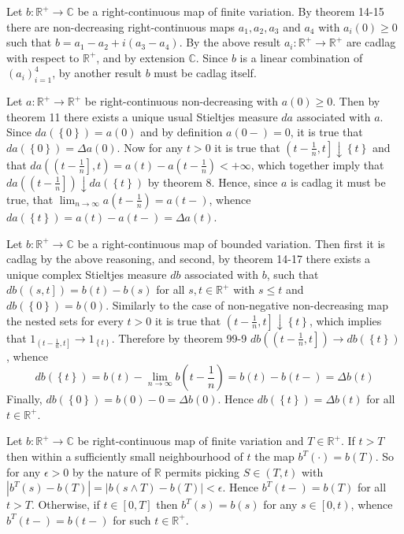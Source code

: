 \documentclass[a4paper]{article}
\newcommand{\obj}[1]{\left\{ #1 \right \}}
\newcommand{\clo}[1]{\left [ #1 \right ]}
\newcommand{\clop}[1]{\left [ #1 \right )}
\newcommand{\ploc}[1]{\left ( #1 \right ]}
\newcommand{\brac}[1]{\left ( #1 \right )}
\newcommand{\abs}[1]{\left | #1 \right |}
\newcommand{\Real}{\mathbb{R}}
\newcommand{\Cplx}{\mathbb{C}}
\begin{document}
Let $b:\Real^+\to \Cplx$ be a right-continuous map of finite variation. By theorem 14-15 there are non-decreasing right-continuous maps $a_1, a_2, a_3$ and $a_4$ with $a_i\brac{0}\geq 0$ such that $b=a_1-a_2+i\brac{a_3-a_4}$. By the above result $a_i:\Real^+\to\Real^+$ are cadlag with respect to $\Real^+$, and by extension $\Cplx$. Since $b$ is a linear combination of $\brac{a_i}_{i=1}^4$, by another result $b$ must be cadlag itself.

Let $a:\Real^+\to \Real^+$ be right-continuous non-decreasing with $a\brac{0}\geq 0$. Then by theorem 11 there exists a unique usual Stieltjes measure $da$ associated with $a$. Since $da\brac{\obj{0}}=a\brac{0}$ and by definition $a\brac{0-}=0$, it is true that $da\brac{\obj{0}}=\Delta a\brac{0}$. Now for any $t>0$ it is true that $\ploc{t-\frac{1}{n},t}\downarrow \obj{t}$ and that $da\brac{\ploc{t-\frac{1}{n}},t}=a\brac{t}-a\brac{t-\frac{1}{n}}<+\infty$, which together imply that $da\brac{\ploc{t-\frac{1}{n}}}\downarrow da\brac{\obj{t}}$ by theorem 8. Hence, since $a$ is cadlag it must be true, that $\lim_{n\to\infty} a\brac{t-\frac{1}{n}}=a\brac{t-}$, whence $da\brac{\obj{t}} = a\brac{t}-a\brac{t-} = \Delta a\brac{t}$.

Let $b:\Real^+\to \Cplx$ be a right-continuous map of bounded variation. Then first it is cadlag by the above reasoning, and second, by theorem 14-17 there exists a unique complex Stieltjes measure $db$ associated with $b$, such that $db\brac{\ploc{s,t}}=b\brac{t}-b\brac{s}$ for all $s,t\in \Real^+$ with $s\leq t$ and $db\brac{\obj{0}}=b\brac{0}$. Similarly to the case of non-negative non-decreasing map the nested sets for every $t>0$ it is true that $\ploc{t-\frac{1}{n},t}\downarrow \obj{t}$, which implies that $1_{\ploc{t-\frac{1}{n}, t}}\to 1_{\obj{t}}$. Therefore by theorem 99-9 $db\brac{\ploc{t-\frac{1}{n},t}}\to db\brac{\obj{t}}$, whence \[db\brac{\obj{t}} = b\brac{t}-\lim_{n\to\infty} b\brac{t-\frac{1}{n}} = b\brac{t}-b\brac{t-} = \Delta b\brac{t}\] Finally, $db\brac{\obj{0}}=b\brac{0}-0=\Delta b\brac{0}$. Hence $db\brac{\obj{t}}=\Delta b\brac{t}$ for all $t\in \Real^+$.

Let $b:\Real^+\to\Cplx$ be right-continuous map of finite variation and $T\in \Real^+$. If $t>T$ then within a sufficiently small neighbourhood of $t$ the map $b^T\brac{\cdot}=b\brac{T}$. So for any $\epsilon>0$ by the nature of $\Real$ permits picking $S\in \brac{T,t}$ with $\abs{b^T\brac{s}-b\brac{T}}=\abs{b\brac{s\wedge T}-b\brac{T}}<\epsilon$. Hence $b^T\brac{t-}=b\brac{T}$ for all $t>T$. Otherwise, if $t\in \clo{0,T}$ then $b^T\brac{s}=b\brac{s}$ for any $s\in \clop{0,t}$, whence $b^T\brac{t-} = b\brac{t-}$ for such $t\in \Real^+$.
\end{document}
